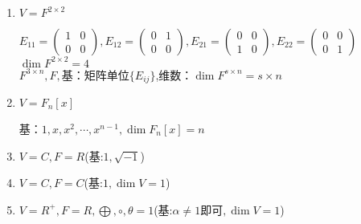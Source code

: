 \begin{property}[线性空间的性质]
\begin{example}
\begin{enumerate}
            \item $V = F^{2 \times 2}$
            \begin{solutiontitle}
                $E_{11} = \left(
                    \begin{array}{ccc}
                        1 & 0 \\
                        0 & 0
                    \end{array}\right),
                E_{12} = \left(
                    \begin{array}{ccc}
                        0 & 1 \\
                        0 & 0
                    \end{array}\right),
                E_{21} = \left(
                    \begin{array}{ccc}
                        0 & 0 \\
                        1 & 0
                    \end{array}\right),
                E_{22} = \left(
                    \begin{array}{ccc}
                        0 & 0 \\
                        0 & 1
                    \end{array}\right)$\\
                $\dim F^{2 \times 2} = 4$\\
                $F^{3 \times n}, F,$基：矩阵单位$\{E_{ij}\}$,维数：$\dim F^{s \times n} = s \times n$
            \end{solutiontitle}

            \item $V = F_n[x]$
            \begin{solutiontitle}
                基：$1, x, x^2, \cdots, x^{n-1}, \dim F_n[x] = n$
            \end{solutiontitle}

            \item $V = C, F = R$(基:$1, \sqrt{-1}$)
            \item $V = C, F = C$(基:$1, \dim V = 1$)
            \item $V = R^+, F = R, \bigoplus, \circ, \theta = 1$(基:$\alpha \neq 1即可, \dim V = 1$)
        \end{enumerate}
    \end{example}
    

\end{property}
